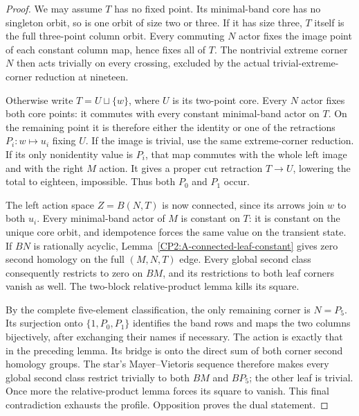 \begin{proof}
We may assume $T$ has no fixed point. Its minimal-band
core has no singleton orbit, so is one orbit of size
two or three. If it has size three, $T$ itself is the
full three-point column orbit. Every commuting $N$
actor fixes the image point of each constant column
map, hence fixes all of $T$. The nontrivial extreme
corner $N$ then acts trivially on every crossing, excluded
by the actual trivial-extreme-corner reduction at nineteen.

Otherwise write $T=U\sqcup\{w\}$, where $U$ is its
two-point core. Every $N$ actor fixes both core points:
it commutes with every constant minimal-band actor on
$T$. On the remaining point it is therefore either
the identity or one of the retractions
$P_i:w\mapsto u_i$ fixing $U$.
If the image is trivial, use the same extreme-corner
reduction. If its only nonidentity value is $P_i$,
that map commutes with the whole left image and with
the right $M$ action. It gives a proper cut retraction
$T\to U$, lowering the total to eighteen, impossible.
Thus both $P_0$ and $P_1$ occur.

The left action space $Z=B(N,T)$ is now connected,
since its arrows join $w$ to both $u_i$.
Every minimal-band actor of $M$ is constant on $T$:
it is constant on the unique core orbit, and idempotence
forces the same value on the transient state.
If $BN$ is rationally acyclic,
Lemma~\ref{CP2:A-connected-leaf-constant} gives zero
second homology on the full $(M,N,T)$ edge. Every global
second class consequently restricts to zero on $BM$,
and its restrictions to both leaf corners vanish as
well. The two-block relative-product lemma kills its
square.

By the complete five-element classification, the only
remaining corner is $N=P_5$. Its surjection onto
$\{1,P_0,P_1\}$ identifies the band rows and maps the
two columns bijectively, after exchanging their names
if necessary. The action is exactly that in the preceding
lemma. Its bridge is onto the direct sum of both corner
second homology groups. The star's Mayer--Vietoris
sequence therefore makes every global second class
restrict trivially to both $BM$ and $BP_5$; the other
leaf is trivial. Once more the relative-product lemma
forces its square to vanish. This final contradiction
exhausts the profile. Opposition proves the dual statement.
\end{proof}
